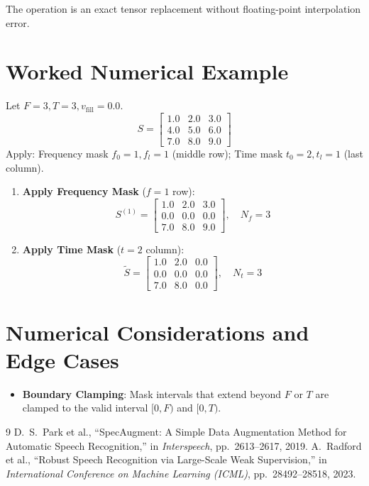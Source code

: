 \documentclass[11pt,a4paper]{article}
\theoremstyle{definition}
\begin{document}
The operation is an exact tensor replacement without floating-point interpolation error.

\section{Worked Numerical Example}

Let $F = 3, T = 3, v_{\text{fill}} = 0.0$.
\begin{equation}
S = \begin{bmatrix} 1.0 & 2.0 & 3.0 \\ 4.0 & 5.0 & 6.0 \\ 7.0 & 8.0 & 9.0 \end{bmatrix}
\end{equation}
Apply: Frequency mask $f_0 = 1, f_l = 1$ (middle row); Time mask $t_0 = 2, t_l = 1$ (last column).

\begin{enumerate}
    \item \textbf{Apply Frequency Mask} ($f=1$ row):
    \begin{equation}
    S^{(1)} = \begin{bmatrix} 1.0 & 2.0 & 3.0 \\ 0.0 & 0.0 & 0.0 \\ 7.0 & 8.0 & 9.0 \end{bmatrix}, \quad N_f = 3
    \end{equation}
    \item \textbf{Apply Time Mask} ($t=2$ column):
    \begin{equation}
    \tilde{S} = \begin{bmatrix} 1.0 & 2.0 & 0.0 \\ 0.0 & 0.0 & 0.0 \\ 7.0 & 8.0 & 0.0 \end{bmatrix}, \quad N_t = 3
    \end{equation}
\end{enumerate}

\section{Numerical Considerations and Edge Cases}

\begin{itemize}
    \item \textbf{Boundary Clamping}: Mask intervals that extend beyond $F$ or $T$ are clamped to the valid interval $[0, F)$ and $[0, T)$.
\end{itemize}

\begin{thebibliography}{9}
 D.~S.~Park et al., ``SpecAugment: A Simple Data Augmentation Method for Automatic Speech Recognition,'' in \emph{Interspeech}, pp.~2613--2617, 2019.
 A.~Radford et al., ``Robust Speech Recognition via Large-Scale Weak Supervision,'' in \emph{International Conference on Machine Learning (ICML)}, pp.~28492--28518, 2023.
\end{thebibliography}
\end{document}
